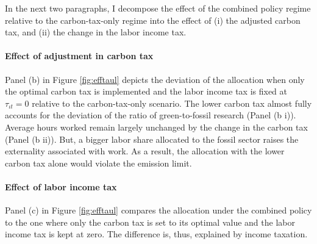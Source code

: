 \begin{figure}[h!!!]
\begin{subfigure}{0.4\textwidth}
	\end{subfigure}
\end{figure} 


In the next two paragraphs, I decompose the effect of the combined policy regime relative to the carbon-tax-only regime into the effect of (i) the adjusted carbon tax, and (ii) the change in the labor income tax. %

\paragraph{Effect of adjustment in carbon tax}
Panel (b) in Figure \ref{fig:efftaul} depicts the deviation of the allocation when only the optimal carbon tax is implemented and the labor income tax is fixed at $\tau_{\iota t}=0$ relative to the carbon-tax-only scenario. The lower carbon tax almost fully accounts for the deviation of the ratio of green-to-fossil research (Panel (b i)). Average hours worked remain largely unchanged by the change in the carbon tax (Panel (b ii)). But, a bigger labor share allocated to the fossil sector raises the externality associated with work. As a result, the allocation with the lower carbon tax alone would violate the emission limit. 


\paragraph{Effect of labor income tax}

Panel (c) in Figure \ref{fig:efftaul} compares the allocation under the combined policy to the one where only the carbon tax is set to its optimal value and the labor income tax is kept at zero. The difference is, thus, explained by income taxation. 

